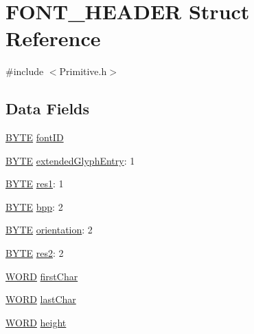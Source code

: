 \hypertarget{struct_f_o_n_t___h_e_a_d_e_r}{}\section{F\+O\+N\+T\+\_\+\+H\+E\+A\+D\+E\+R Struct Reference}
\label{struct_f_o_n_t___h_e_a_d_e_r}


{\ttfamily \#include $<$Primitive.\+h$>$}

\subsection*{Data Fields}
\begin{DoxyCompactItemize}
\item 
\hyperlink{_generic_type_defs_8h_a4ae1dab0fb4b072a66584546209e7d58}{B\+Y\+T\+E} \hyperlink{struct_f_o_n_t___h_e_a_d_e_r_a69d5237e1cca09d6eae27e1301adcaac}{font\+I\+D}
\item 
\hyperlink{_generic_type_defs_8h_a4ae1dab0fb4b072a66584546209e7d58}{B\+Y\+T\+E} \hyperlink{struct_f_o_n_t___h_e_a_d_e_r_adc7b04057cc829ed5f64dc80519ff0be}{extended\+Glyph\+Entry}\+: 1
\item 
\hyperlink{_generic_type_defs_8h_a4ae1dab0fb4b072a66584546209e7d58}{B\+Y\+T\+E} \hyperlink{struct_f_o_n_t___h_e_a_d_e_r_a44aabc97449e6441f078daab76739f6f}{res1}\+: 1
\item 
\hyperlink{_generic_type_defs_8h_a4ae1dab0fb4b072a66584546209e7d58}{B\+Y\+T\+E} \hyperlink{struct_f_o_n_t___h_e_a_d_e_r_af02776c3f111a79a638c5de8c5cc4f40}{bpp}\+: 2
\item 
\hyperlink{_generic_type_defs_8h_a4ae1dab0fb4b072a66584546209e7d58}{B\+Y\+T\+E} \hyperlink{struct_f_o_n_t___h_e_a_d_e_r_a63619c77ad2a7669ed967907342d1057}{orientation}\+: 2
\item 
\hyperlink{_generic_type_defs_8h_a4ae1dab0fb4b072a66584546209e7d58}{B\+Y\+T\+E} \hyperlink{struct_f_o_n_t___h_e_a_d_e_r_acb6ef262e7e4611ddc08e67fadbbaace}{res2}\+: 2
\item 
\hyperlink{_generic_type_defs_8h_a2b0e863dadf920709ec53d9088ee7c91}{W\+O\+R\+D} \hyperlink{struct_f_o_n_t___h_e_a_d_e_r_afaf8d9e275cbaade75cb1e8080f648be}{first\+Char}
\item 
\hyperlink{_generic_type_defs_8h_a2b0e863dadf920709ec53d9088ee7c91}{W\+O\+R\+D} \hyperlink{struct_f_o_n_t___h_e_a_d_e_r_a784ccaf76c4b2671e232f6f9605783d6}{last\+Char}
\item 
\hyperlink{_generic_type_defs_8h_a2b0e863dadf920709ec53d9088ee7c91}{W\+O\+R\+D} \hyperlink{struct_f_o_n_t___h_e_a_d_e_r_a919b3b1495d055253ab29ef130f6d9cf}{height}
\end{DoxyCompactItemize}


